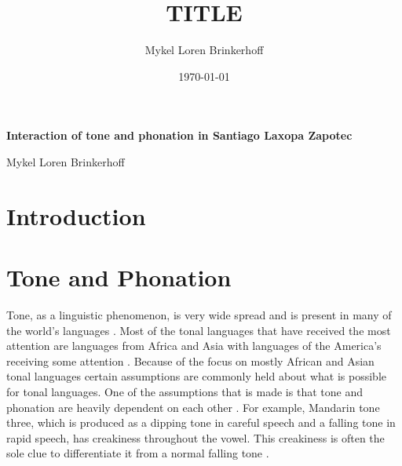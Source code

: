 \documentclass[12pt, letterpaper]{article}
\title{TITLE}
\author{Mykel Loren Brinkerhoff}
\date{\today}
\begin{document}
	
	
	\onehalfspacing
	
\begin{center}
	{\Large \textbf{Interaction of tone and phonation in Santiago Laxopa Zapotec}}
	\vspace{6pt}

	Mykel Loren Brinkerhoff
\end{center}
\thispagestyle{fancy}


\section{Introduction} \label{sec:Introduction}



\section{Tone and Phonation} \label{sec:TonePhonation}

Tone, as a linguistic phenomenon, is very wide spread and is present in many of the world's languages \citep{yipTone2002}. Most of the tonal languages that have received the most attention are languages from Africa and Asia with languages of the America's receiving some attention \citep{pikeToneLanguagesTechnique1948,silvermanLaryngealComplexityOtomanguean1997,campbellOtomangueanHistoricalLinguistics2017a,campbellOtomangueanHistoricalLinguistics2017}. Because of the focus on mostly African and Asian tonal languages certain assumptions are commonly held about what is possible for tonal languages. One of the assumptions that is made is that tone and phonation are heavily dependent on each other \citep{andruskiPhonationTypesProduction2000,yipTone2002,garellekVoiceQualityTone2013,brunelleTonePhonationSoutheast2016,weePhonologicalTone2019,hymanToneSystems2020,garellekPhoneticsWhiteHmong2021}. For example, Mandarin tone three, which is produced as a dipping tone in careful speech and a falling tone in rapid speech, has creakiness throughout the vowel. This creakiness is often the sole clue to differentiate it from a normal falling tone \citep{duanmuPhonologyStandardChinese2007,kuangCovariationVoiceQuality2017}. 
\end{document}
